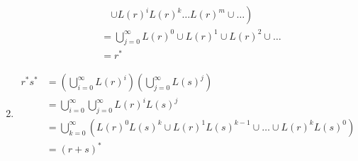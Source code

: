 \documentclass[11pt,a4paper]{article}
\numberwithin{equation}{section}
\begin{document}
\begin{enumerate}
\begin{equation}
\begin{aligned}
                        &\quad \left. \cup L(r)^i L(r)^k \ldots L(r)^m \cup \ldots \right) \\
                        &= \bigcup_{j=0}^{\infty} L(r)^0 \cup L(r)^1 \cup L(r)^2 \cup \ldots \\
                        &= r^*
            \end{aligned}
        \end{equation}
    \item 
        \begin{equation}
            \begin{aligned}
                r^*s^* &= \left( \bigcup_{i=0}^{\infty} L(r)^i \right) \left( \bigcup_{j=0}^{\infty} L(s)^j \right) \\
                        &= \bigcup_{i=0}^{\infty} \bigcup_{j=0}^{\infty} L(r)^i L(s)^j \\
                        &= \bigcup_{k=0}^{\infty} \left( L(r)^0 L(s)^k \cup L(r)^1 L(s)^{k-1} \cup \ldots \cup L(r)^k L(s)^0 \right) \\
                        &= (r+s)^*
            \end{aligned}
        \end{equation}
\end{enumerate}
\end{document}
